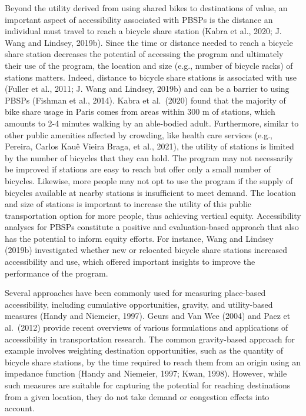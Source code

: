 \documentclass[]{elsarticle} %
\begin{document}
Beyond the utility derived from using shared bikes to destinations of
value, an important aspect of accessibility associated with PBSPs is the
distance an individual must travel to reach a bicycle share station
(Kabra et al., 2020; J. Wang and Lindsey, 2019b). Since the time or
distance needed to reach a bicycle share station decreases the potential
of accessing the program and ultimately their use of the program, the
location and size (e.g., number of bicycle racks) of stations matters.
Indeed, distance to bicycle share stations is associated with use
(Fuller et al., 2011; J. Wang and Lindsey, 2019b) and can be a barrier
to using PBSPs (Fishman et al., 2014). Kabra et al.~(2020) found that
the majority of bike share usage in Paris comes from areas within 300 m
of stations, which amounts to 2-4 minutes walking by an able-bodied
adult. Furthermore, similar to other public amenities affected by
crowding, like health care services (e.g., Pereira, Carlos Kauê Vieira
Braga, et al., 2021), the utility of stations is limited by the number
of bicycles that they can hold. The program may not necessarily be
improved if stations are easy to reach but offer only a small number of
bicycles. Likewise, more people may not opt to use the program if the
supply of bicycles available at nearby stations is insufficient to meet
demand. The location and size of stations is important to increase the
utility of this public transportation option for more people, thus
achieving vertical equity. Accessibility analyses for PBSPs constitute a
positive and evaluation-based approach that also has the potential to
inform equity efforts. For instance, Wang and Lindsey (2019b)
investigated whether new or relocated bicycle share stations increased
accessibility and use, which offered important insights to improve the
performance of the program.

Several approaches have been commonly used for measuring place-based
accessibility, including cumulative opportunities, gravity, and
utility-based measures (Handy and Niemeier, 1997). Geurs and Van Wee
(2004) and Paez et al.~(2012) provide recent overviews of various
formulations and applications of accessibility in transportation
research. The common gravity-based approach for example involves
weighting destination opportunities, such as the quantity of bicycle
share stations, by the time required to reach them from an origin using
an impedance function (Handy and Niemeier, 1997; Kwan, 1998). However,
while such measures are suitable for capturing the potential for
reaching destinations from a given location, they do not take demand or
congestion effects into account.
\end{document}
